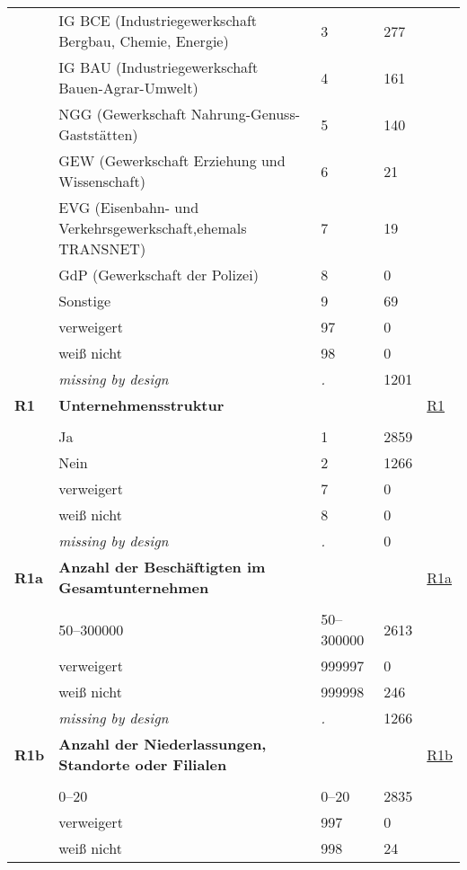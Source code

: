 \begin{longtable}{| L{2.65cm} | L{8cm} | C{1.5cm} | R{1.25cm} | C{2.25cm}  |}
   & IG BCE (Industriegewerkschaft Bergbau, Chemie, Energie) & 3 & 277 &  \\ 
   & IG BAU (Industriegewerkschaft Bauen-Agrar-Umwelt) & 4 & 161 &  \\ 
   & NGG (Gewerkschaft Nahrung-Genuss-Gaststätten) & 5 & 140 &  \\ 
   & GEW (Gewerkschaft Erziehung und Wissenschaft) & 6 & 21 &  \\ 
   & EVG (Eisenbahn- und Verkehrsgewerkschaft,ehemals TRANSNET) & 7 & 19 &  \\ 
   & GdP (Gewerkschaft der Polizei) & 8 & 0 &  \\ 
   & Sonstige & 9 & 69 &  \\ 
   & verweigert & 97 & 0 &  \\ 
   & weiß nicht & 98 & 0 &  \\ 
   & \textit{missing by design} & \textit{.} & 1201 &  \\ 
   \midrule
\textbf{R1}\label{var:R1} & \textbf{Unternehmensstruktur} &  &  & \hyperref[R1]{R1} \\ 
   &  &  &  &  \\ 
   & Ja & 1 & 2859 &  \\ 
   & Nein & 2 & 1266 &  \\ 
   & verweigert & 7 & 0 &  \\ 
   & weiß nicht & 8 & 0 &  \\ 
   & \textit{missing by design} & \textit{.} & 0 &  \\ 
   \midrule
\textbf{R1a}\label{var:R1a} & \textbf{Anzahl der Beschäftigten im Gesamtunternehmen} &  &  & \hyperref[R1a]{R1a} \\ 
   &  &  &  &  \\ 
   & 50--300000 & 50--300000 & 2613 &  \\ 
   & verweigert & 999997 & 0 &  \\ 
   & weiß nicht & 999998 & 246 &  \\ 
   & \textit{missing by design} & \textit{.} & 1266 &  \\ 
   \midrule
\textbf{R1b}\label{var:R1b} & \textbf{Anzahl der Niederlassungen, Standorte oder Filialen} &  &  & \hyperref[R1b]{R1b} \\ 
   &  &  &  &  \\ 
   & 0--20 & 0--20 & 2835 &  \\ 
   & verweigert & 997 & 0 &  \\ 
   & weiß nicht & 998 & 24 &  \\ 

\end{longtable}
